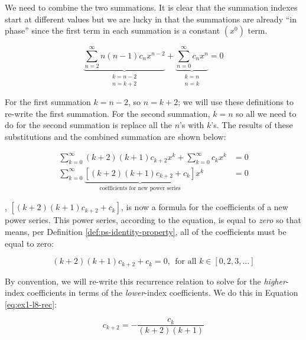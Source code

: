 \noindent We need to combine the two summations.  It is clear that the summation indexes start at different values but we are lucky in that the summations are already ``in phase'' since the first term in each summation is a constant $(x^0)$ term.

\begin{equation*}
\underbrace{\sum\limits_{n=2}^{\infty} n(n-1)c_nx^{n-2}}_{\substack{k=n-2 \\ n=k+2}} + \underbrace{\sum\limits_{n=0}^{\infty} c_n x^n}_{\substack{k=n \\ n=k}} = 0
\end{equation*}

\noindent For the first summation $k=n-2$, so $n=k+2$; we will use these definitions to re-write the first summation.  For the second summation, $k=n$ so all we need to do for the second summation is replace all the $n$'s with $k$'s.  The results of these substitutions and the combined summation are shown below:

\begin{align*}
\sum\limits_{k=0}^{\infty} (k+2)(k+1)c_{k+2}x^k + \sum\limits_{k=0}^{\infty} c_k x^k &= 0 \\
\sum\limits_{k=0}^{\infty}\underbrace{\left[(k+2)(k+1)c_{k+2} + c_k \right]}_{\text{coefficients for new power series}}x^k&=0
\end{align*}

, $\left[(k+2)(k+1)c_{k+2}+c_k \right]$, is now a formula for the coefficients of a new power series. This power series, according to the equation, is equal to \emph{zero} so that means, per Definition \ref{def:ps-identity-property}, all of the coefficients must be equal to zero:

\begin{equation*}
(k+2)(k+1)c_{k+2} + c_{k} = 0, \ \ \text{for all } k \in [0,2,3,\dots]
\end{equation*} 


By convention, we will re-write this recurrence relation to solve for the \emph{higher}-index coefficients in terms of the \emph{lower}-index coefficients.  We do this in Equation \ref{eq:ex1-l8-rec}:

\begin{equation}
c_{k+2}=-\frac{c_k}{(k+2)(k+1)}
\label{eq:ex1-l8-rec}
\end{equation}

